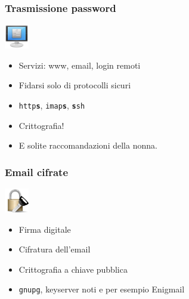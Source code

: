 \documentclass[xcolor=svgnames,handout]{beamer}
\begin{document}
\begin{frame}
	\frametitle{Trasmissione password}

	\begin{block}{\includegraphics[width=40px]{img/login.png}}
			\begin{itemize}
					\item Servizi: www, email, login remoti
						\pause
					\item Fidarsi solo di protocolli sicuri
						\pause
					\item \texttt{http{\bf s}}, \texttt{imap{\bf s}}, \texttt{{\bf s}sh}
						\pause
					\item Crittografia!
						\pause
					\item E solite raccomandazioni della nonna.
			\end{itemize}
	\end{block}
\end{frame}

\begin{frame}
	\frametitle{Email cifrate}

	\begin{block}{\includegraphics[width=40px]{img/crypto.png}}
			\begin{itemize}
					\item Firma digitale
						\pause
					\item Cifratura dell'email
						\pause
					\item Crittografia a chiave pubblica
						\pause
					\item \texttt{gnupg}, keyserver noti e per esempio Enigmail
			\end{itemize}
	\end{block}
						
	\pause

\end{frame}
\end{document}
